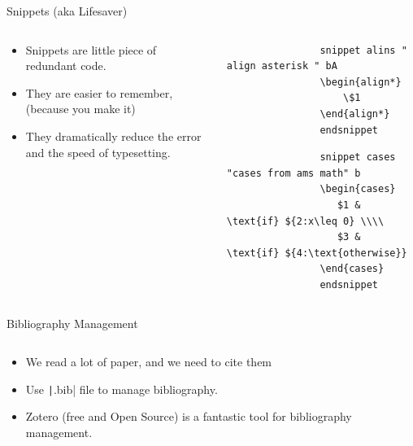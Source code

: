 \documentclass[aspectratio=169]{beamer}
\begin{document}
\begin{frame}[fragile]{Snippets (aka Lifesaver)}
    \begin{columns}
        \begin{column}{0.49\textwidth}
            \begin{itemize}
                \item Snippets are little piece of redundant code.
                \item They are easier to remember, (because you make it)
                \item They dramatically reduce the error and the speed of typesetting.
            \end{itemize}
        \end{column}
        \begin{column}{0.49\textwidth}
            \begin{verbatim}
                snippet alins " align asterisk " bA
                \begin{align*}
                    \$1
                \end{align*}
                endsnippet
            \end{verbatim}
            \begin{verbatim}
                snippet cases "cases from ams math" b
                \begin{cases}
                   $1 & \text{if} ${2:x\leq 0} \\\\
                   $3 & \text{if} ${4:\text{otherwise}}
                \end{cases}
                endsnippet
            \end{verbatim}
        \end{column}
    \end{columns}
\end{frame} 
%
%
%
\begin{frame}{Bibliography Management}
    \begin{columns}
        \begin{column}{0.49\textwidth}
            \begin{itemize}
                \item We read a lot of paper, and we need to cite them
                \item Use \texttt|.bib| file to manage bibliography.
                \item Zotero (free and Open Source) is a fantastic tool for bibliography management.
            \end{itemize}
        \end{column}
        \begin{column}{0.49\textwidth}
        \end{column}
    \end{columns}
\end{frame} 
%
%
%
\end{document}
